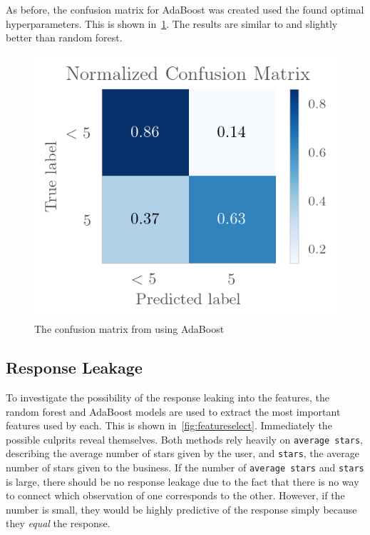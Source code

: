 As before, the confusion matrix for AdaBoost was created used the found
optimal hyperparameters. This is shown in~\cref{fig:adaboost_conf}. The results
are similar to and slightly better than random forest.

\begin{figure}[H]
    \centering
    \includegraphics{Figures/ada_conf.png}
    \caption{The confusion matrix from using AdaBoost}
    \label{fig:adaboost_conf}
\end{figure}

\subsection{Response Leakage}\label{subsec:response_leakage}

To investigate the possibility of the response leaking into the features,
the random forest and AdaBoost models are used to extract the most important
features used by each. This is shown in~\cref{fig:featureselect}. Immediately the possible culprits reveal themselves. Both
methods rely heavily on \texttt{average stars}, describing the average number of stars given by the user, and \texttt{stars}, the average number of stars given
to the business. If the number of \texttt{average stars} and \texttt{stars} is 
large, there should be no response leakage due to the fact that there is no way to connect which observation of one corresponds to the other. However, if the number is small, they
would be highly predictive of the response simply because they \textit{equal} the
response. 

